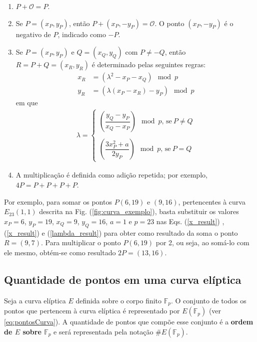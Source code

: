 \begin{enumerate}
  \item $P + \mathcal{O} = P$.
  \item Se $P = (x_P, y_P)$, então $P + (x_P, -y_P) = \mathcal{O}$. O ponto $(x_P, -y_P)$ é o negativo de \(P\), indicado como \(-P\).
  \item Se $P = (x_P, y_P)$ e $Q = (x_Q, y_Q)$ com $P \neq -Q$, então $R = P + Q = (x_R, y_R)$ é determinado pelas seguintes regras:
    \begin{align}
    x_R &=(\lambda^2 - x_P - x_Q) \mod p \label{x_result} \\
    y_R &=(\lambda(x_P - x_R) - y_P) \mod p \label{y_result}
    \end{align}
  em que
    \begin{align}
    \label{lambda_result}
    \lambda =
    \begin{cases}
    \left(\dfrac{y_Q - y_P}{x_Q - x_P}\right) \mod p \textrm{, se} \ P \neq Q \\ \\
    \left(\dfrac{3x_P^2 + a}{2y_P}\right) \mod p \textrm{, se} \ P = Q
    \end{cases}
    \end{align}
  \item A multiplicação é definida como adição repetida; por exemplo, $4P = P + P + P + P$.
\end{enumerate}

Por exemplo, para somar os pontos $P(6, 19)$ e $(9, 16)$, pertencentes à curva $E_{23}(1, 1)$ descrita na Fig. (\ref{fig:curva_exemplo}), basta substituir os valores \(x_P = 6\), \(y_P = 19\), \(x_Q = 9\), \(y_Q = 16\), \(a = 1\) e \(p = 23\) nas Eqs. (\ref{x_result})
, (\ref{x_result}) e (\ref{lambda_result}) para obter como resultado da soma o ponto \(R = (9, 7)\). Para multiplicar o ponto $P(6,19)$ por 2, ou seja, ao somá-lo com ele mesmo, obtém-se como resultado \(2P = (13, 16)\).


%
\subsection{Quantidade de pontos em uma curva elíptica}
Seja a curva elíptica $E$ definida sobre o corpo finito $\mathbb{F}_p$. O conjunto de todos os pontos que pertencem à curva elíptica é representado por $E(\mathbb{F}_p)$ (ver \ref{eq:pontosCurva}). A quantidade de pontos que compõe esse conjunto é a \textbf{ordem de $E$ sobre $\mathbb{F}_p$} e será representada pela notação $\#E(\mathbb{F}_p)$. \cite{Guide}

